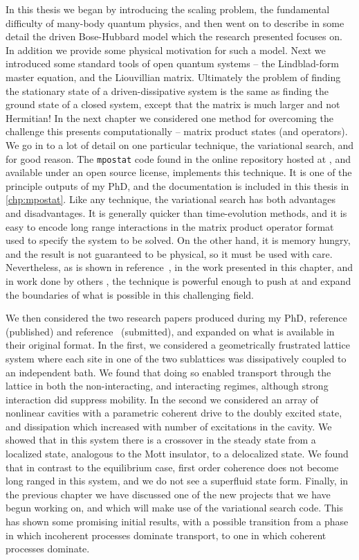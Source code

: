 In this thesis we began by introducing the scaling problem, the fundamental difficulty of many-body quantum physics, and then went on to describe in some detail the driven Bose-Hubbard model which the research presented focuses on. In addition we provide some physical motivation for such a model. Next we introduced some standard tools of open quantum systems -- the Lindblad-form master equation, and the Liouvillian matrix. Ultimately the problem of finding the stationary state of a driven-dissipative system is the same as finding the ground state of a closed system, except that the matrix is much larger and not Hermitian! In the next chapter we considered one method for overcoming the challenge this presents computationally -- matrix product states (and operators). We go in to a lot of detail on one particular technique, the variational search, and for good reason. The \lstinline$mpostat$ code found in the online repository hosted at \cite{otb:gitVSSS}, and available under an open source license, implements this technique. It is one of the principle outputs of my PhD, and the documentation is included in this thesis in \cref{chp:mpostat}. Like any technique, the variational search has both advantages and disadvantages. It is generally quicker than time-evolution methods, and it is easy to encode long range interactions in the matrix product operator format used to specify the system to be solved. On the other hand, it is memory hungry, and the result is not guaranteed to be physical, so it must be used with care. Nevertheless, as is shown in reference~\cite{Owen2017}, in the work presented in this chapter, and in work done by others \cite{Cui2015,Mascarenhas2015}, the technique is powerful enough to push at and expand the boundaries of what is possible in this challenging field. 

We then considered the two research papers produced during my PhD, reference~\cite{Owen2017} (published) and reference~\cite{Brown2018} (submitted), and expanded on what is available in their original format. In the first, we considered a geometrically frustrated lattice system where each site in one of the two sublattices was dissipatively coupled to an independent bath. We found that doing so enabled transport through the lattice in both the non-interacting, and interacting regimes, although strong interaction did suppress mobility. In the second we considered an array of nonlinear cavities with a parametric coherent drive to the doubly excited state, and dissipation which increased with number of excitations in the cavity. We showed that in this system there is a crossover in the steady state from a localized state, analogous to the Mott insulator, to a delocalized state. We found that in contrast to the equilibrium case, first order coherence does not become long ranged in this system, and we do not see a superfluid state form. Finally, in the previous chapter we have discussed one of the new projects that we have begun working on, and which will make use of the variational search code. This has shown some promising initial results, with a possible transition from a phase in which incoherent processes dominate transport, to one in which coherent processes dominate. 

